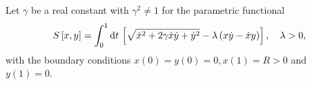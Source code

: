 \begin{question}
\def\xd{\dot{x}}%
\def\yd{\dot{y}}%
Let $\gamma$ be a real constant with $\gamma^2 \neq 1 $ for the parametric functional
\[
	S\lrs{x,y} = \Int{0}{1}{t} \lrs{\sqrt{\xd^2 + 2\gamma\xd\yd + \yd^2} - \lambda\lr{x\yd - \xd y}},\quad \lambda > 0,
\]
with the boundary conditions $x(0) = y(0) = 0, x(1) = R > 0$ and $y(1) = 0$.
\qpart %

\qpart %

\qpart %

\end{question}